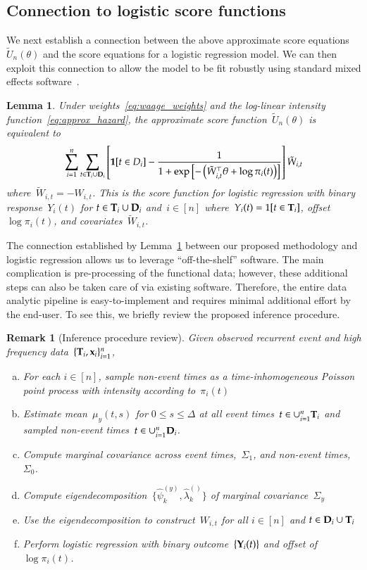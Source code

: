 \documentclass[12pt]{amsart}
\newtheorem{lemma}[thm]{Lemma}
\newtheorem{rmk}[thm]{Remark}%
\def\Y{{\bf Y}}
\def\bfx{{\bf x}}
\def\bfT{{\bf T}}
\def\bfD{{\bf D}}
\begin{document}
\subsection{Connection to logistic score functions}
\label{eq:logistication}

We next establish a connection between the above approximate score equations~$\tilde U_n (\theta)$ and the score equations for a logistic regression model. We can then exploit this connection to allow the model to be fit robustly using standard mixed effects software~\citep{Ruppert2002, McCulloch2001}.

\begin{lemma} \normalfont
\label{lemma:logistic}
Under weights~\eqref{eq:waage_weights} and the log-linear intensity function~\eqref{eq:approx_hazard}, the approximate score function~$\tilde U_n (\theta)$ is equivalent to
\[
\sum_{i=1}^n \sum_{t \in \bfT_i \cup \bfD_i } \left[ {\bf 1}[t \in D_i]
  - \frac{1}{1 + \exp \left[- \left( \tilde{W}_{i,t}^\top \theta +
        \log \pi_i (t) \right) \right]} \right] \tilde{W}_{i,t}
\]
where~$\tilde W_{i,t} = -W_{i,t}$. This is the score function for logistic regression with binary response~$Y_i(t)$ for $t \in \bfT_i \cup \bfD_i$ and~$i \in [n]$ where~$Y_i(t) = 1[t \in \bfT_i]$, offset~$\log \pi_i (t)$, and covariates~$\tilde W_{i,t}$.
\end{lemma}

The connection established by Lemma~\ref{lemma:logistic} between our proposed methodology and logistic regression allows us to leverage ``off-the-shelf'' software.  The main complication is pre-processing of the functional data; however, these additional steps can also be taken care of via existing software.  Therefore, the entire data analytic pipeline is easy-to-implement and requires minimal additional effort by the end-user. To see this, we briefly review the proposed inference procedure.

\begin{rmk}[Inference procedure review] \normalfont
Given observed recurrent event and high frequency data~$\{ \bfT_i, \bfx_i \}_{i=1}^n$,
\begin{enumerate}[(a)]
\item For each $i \in [n]$, sample non-event times as a time-inhomogeneous Poisson point process with intensity according to~$\pi_i (t)$
\item \label{p2} Estimate mean~$\mu_y (t,s)$ for $0 \leq s \leq \Delta$ at all event times~$t \in \cup_{i=1}^n \bfT_i$ and sampled non-event times~$t \in \cup_{i=1}^n \bfD_i$.
\item \label{p3} Compute marginal covariance across event times,~$\Sigma_1$, and non-event times,~$\Sigma_0$.
\item \label{p4} Compute eigendecomposition~$\{ \hat \psi_k^{(y)}, \hat \lambda_k^{()} \}$ of marginal covariance~$\Sigma_y$
\item Use the eigendecomposition to construct~$W_{i,t}$ for all $i \in [n]$ and $t \in \bfD_i \cup \bfT_i$
\item \label{point:log} Perform logistic regression with binary outcome~$\{ \Y_i (t) \}$  and offset of~$\log \pi_i (t)$.
\end{enumerate}
\end{rmk}
\end{document}

